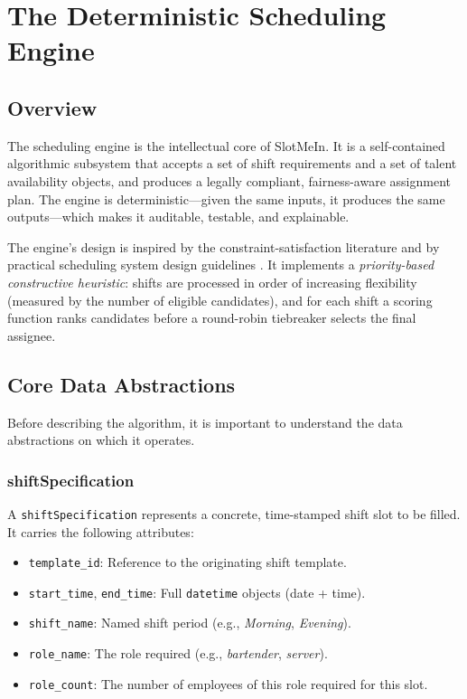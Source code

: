 \chapter{The Deterministic Scheduling Engine}

\section{Overview}

The scheduling engine is the intellectual core of SlotMeIn. It is a self-contained algorithmic subsystem that accepts a set of shift requirements and a set of talent availability objects, and produces a legally compliant, fairness-aware assignment plan. The engine is deterministic—given the same inputs, it produces the same outputs—which makes it auditable, testable, and explainable.

The engine's design is inspired by the constraint-satisfaction literature \cite{rossi_et_al_2006} and by practical scheduling system design guidelines \cite{pinedo_2016}. It implements a \textit{priority-based constructive heuristic}: shifts are processed in order of increasing flexibility (measured by the number of eligible candidates), and for each shift a scoring function ranks candidates before a round-robin tiebreaker selects the final assignee.

\section{Core Data Abstractions}

Before describing the algorithm, it is important to understand the data abstractions on which it operates.

\subsection{shiftSpecification}

A \texttt{shiftSpecification} represents a concrete, time-stamped shift slot to be filled. It carries the following attributes:
\begin{itemize}
    \item \texttt{template\_id}: Reference to the originating shift template.
    \item \texttt{start\_time}, \texttt{end\_time}: Full \texttt{datetime} objects (date + time).
    \item \texttt{shift\_name}: Named shift period (e.g., \textit{Morning}, \textit{Evening}).
    \item \texttt{role\_name}: The role required (e.g., \textit{bartender}, \textit{server}).
    \item \texttt{role\_count}: The number of employees of this role required for this slot.
\end{itemize}

